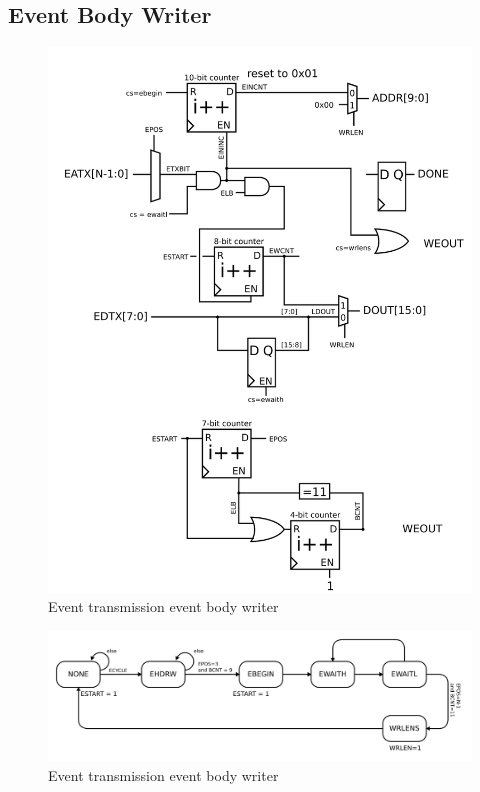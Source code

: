 \subsection{Event Body Writer}
\begin{figure}
\begin{centering}
\includegraphics[scale=0.8]{eventtx.eventbody.svg}
\end{centering}
\caption{Event transmission event body writer}
\label{eventtx.eventbody}
\end{figure}

\begin{figure}
\begin{centering}
\includegraphics[scale=0.8]{eventtx.eventbody.fsm.svg}
\end{centering}
\caption{Event transmission event body writer}
\label{eventtx.eventbody.fsm}
\end{figure}

